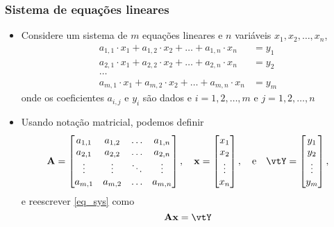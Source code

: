 \begin{frame}
  \frametitle{Sistema de equações lineares}
  \begin{itemize}\small
    \item Considere um sistema de $m$ equações lineares e $n$ variáveis $x_1, x_2, \ldots, x_n$,
    \begin{equation}\label{eq_sys}
      \begin{split}
        a_{1,1}\cdot x_1 + a_{1,2}\cdot x_2 + \ldots + a_{1,n}\cdot x_n &= y_1 \\
        a_{2,1}\cdot x_1 + a_{2,2}\cdot x_2 + \ldots + a_{2,n}\cdot x_n &= y_2 \\
        \ldots & \\
        a_{m,1}\cdot x_1 + a_{m,2}\cdot x_2 + \ldots + a_{m,n}\cdot x_n &= y_m
      \end{split}
    \end{equation}
    onde os coeficientes $a_{i,j}$ e $y_{i}$ são dados e $i = 1, 2, \ldots, m$ e $j = 1, 2, \ldots, n$
    \item Usando notação matricial, podemos definir
    \begin{equation}
      \mathbf{A} =
      \left[\begin{matrix}
        a_{1,1} & a_{1,2} & \ldots & a_{1,n} \\
        a_{2,1} & a_{2,2} & \ldots & a_{2,n} \\
        \vdots & \vdots & \ddots & \vdots \\
        a_{m,1} & a_{m,2} & \ldots & a_{m,n}
      \end{matrix}\right],
      \quad
      \mathbf{x} =
      \left[\begin{matrix}
        x_1 \\
        x_2 \\
        \vdots \\
        x_n
      \end{matrix}\right],
      \quad \text{e} \quad
      \vtY =
      \left[\begin{matrix}
        y_1 \\
        y_2 \\
        \vdots \\
        y_m
      \end{matrix}\right],
    \end{equation}
    e reescrever \eqref{eq_sys} como
    \begin{equation}\label{eq_sis_mat}
      \mathbf{A}\mathbf{x} = \vtY
    \end{equation}
  \end{itemize}
\end{frame}

